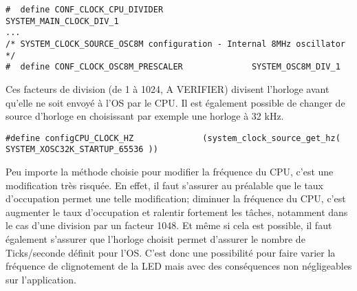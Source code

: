 \begin{lstlisting}[style=CStyle]
#  define CONF_CLOCK_CPU_DIVIDER                  SYSTEM_MAIN_CLOCK_DIV_1
...
/* SYSTEM_CLOCK_SOURCE_OSC8M configuration - Internal 8MHz oscillator */
#  define CONF_CLOCK_OSC8M_PRESCALER              SYSTEM_OSC8M_DIV_1

\end{lstlisting}

Ces facteurs de division (de 1 à 1024, A VERIFIER) divisent l'horloge avant qu'elle ne soit envoyé à l'OS par le CPU.
Il est également possible de changer de source d'horloge en choisissant par exemple une horloge à 32 kHz.

\begin{lstlisting}[style=CStyle]
    #define configCPU_CLOCK_HZ				(system_clock_source_get_hz( SYSTEM_XOSC32K_STARTUP_65536 ))
\end{lstlisting}

Peu importe la méthode choisie pour modifier la fréquence du CPU, c'est une modification très risquée.
En effet, il faut s'assurer au préalable que le taux d'occupation permet une telle modification; diminuer la fréquence du CPU, c'est augmenter le taux d'occupation et ralentir fortement les tâches, notamment dans le cas d'une division par un facteur 1048.
Et même si cela est possible, il faut également s'assurer que l'horloge choisit permet d'assurer le nombre de Ticks/seconde définit pour l'OS.
C'est donc une possibilité pour faire varier la fréquence de clignotement de la LED mais avec des conséquences non négligeables sur l'application.